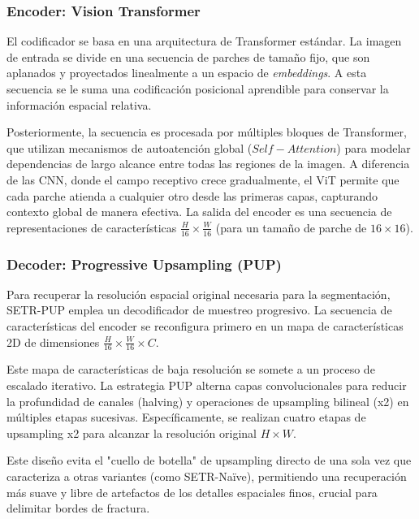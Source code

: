 \documentclass[onecolumn, 12pt , journal]{IEEEtran}
\begin{document}
\subsubsection{Encoder: Vision Transformer}

El codificador se basa en una arquitectura de Transformer estándar. La imagen de entrada se divide en una secuencia de parches de tamaño fijo, que son aplanados y proyectados linealmente a un espacio de \emph{embeddings}. A esta secuencia se le suma una codificación posicional aprendible para conservar la información espacial relativa.

Posteriormente, la secuencia es procesada por múltiples bloques de Transformer, que utilizan mecanismos de autoatención global ($Self-Attention$) para modelar dependencias de largo alcance entre todas las regiones de la imagen. A diferencia de las CNN, donde el campo receptivo crece gradualmente, el ViT permite que cada parche atienda a cualquier otro desde las primeras capas, capturando contexto global de manera efectiva. La salida del encoder es una secuencia de representaciones de características $\frac{H}{16} \times \frac{W}{16}$ (para un tamaño de parche de $16 \times 16$).

\subsubsection{Decoder: Progressive Upsampling (PUP)}

Para recuperar la resolución espacial original necesaria para la segmentación, SETR-PUP emplea un decodificador de muestreo progresivo. La secuencia de características del encoder se reconfigura primero en un mapa de características 2D de dimensiones $\frac{H}{16} \times \frac{W}{16} \times C$.

Este mapa de características de baja resolución se somete a un proceso de escalado iterativo. La estrategia PUP alterna capas convolucionales para reducir la profundidad de canales (halving) y operaciones de upsampling bilineal (x2) en múltiples etapas sucesivas. Específicamente, se realizan cuatro etapas de upsampling x2 para alcanzar la resolución original $H \times W$.

Este diseño evita el "cuello de botella" de upsampling directo de una sola vez que caracteriza a otras variantes (como SETR-Naïve), permitiendo una recuperación más suave y libre de artefactos de los detalles espaciales finos, crucial para delimitar bordes de fractura.
\end{document}
